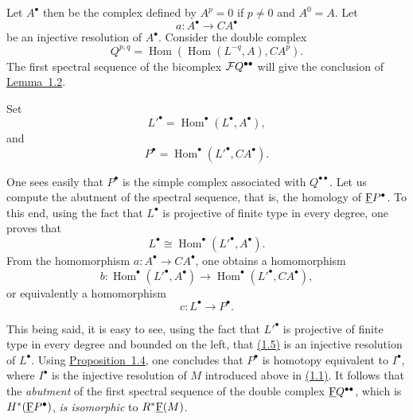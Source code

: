 Let $A^\bullet$ then be the complex defined by $A^p=0$ if $p\ne 0$ and
$A^0=A$. Let
\[
  a\colon A^\bullet\longrightarrow CA^\bullet
\]
be an injective resolution of $A^\bullet$. Consider the double complex
\begin{equation}\label{eq:VIII.1.2}
  Q^{p,q}=\operatorname{Hom}(\operatorname{Hom}(L^{-q},A),CA^p).
\end{equation}
The first spectral sequence of the bicomplex $\cF Q^{\bullet\bullet}$ will
give the conclusion of \hyperref[VIII.1.2]{Lemma~1.2}.

Set
\begin{equation}\label{eq:VIII.1.3}
  {L'}^\bullet=\operatorname{Hom}^\bullet(L^\bullet,A^\bullet),
\end{equation}
and
\begin{equation}\label{eq:VIII.1.4}
  P^\bullet=\operatorname{Hom}^\bullet({L'}^\bullet,CA^\bullet).
\end{equation}


\renewcommand{\theequation}{1.\arabic{equation}}\setcounter{equation}{4}

One sees easily that $P^\bullet$ is the simple complex associated with
$Q^{\bullet\bullet}$. Let us compute the abutment of the spectral sequence,
that is, the homology of $\underline{\mathrm F} P^\bullet$. To this end, using the fact that
$L^\bullet$ is projective of finite type in every degree, one proves that
\[
  L^\bullet \cong \operatorname{Hom}^\bullet({L'}^\bullet,A^\bullet).
\]
From the homomorphism $a\colon A^\bullet\to CA^\bullet$, one obtains a
homomorphism
\[
  b\colon \operatorname{Hom}^\bullet({L'}^\bullet,A^\bullet)
  \longrightarrow \operatorname{Hom}^\bullet({L'}^\bullet,CA^\bullet),
\]
or equivalently a homomorphism
\begin{equation}\label{eq:VIII.1.5}
  c\colon L^\bullet\longrightarrow P^\bullet.
\end{equation}

This being said, it is easy to see, using the fact that ${L'}^\bullet$ is
projective of finite type in every degree and bounded on the left, that
\hyperref[eq:VIII.1.5]{(1.5)} is an injective resolution of $L^\bullet$. Using \hyperref[VIII.1.4]{Proposition~1.4}, one
concludes that $P^\bullet$ is homotopy equivalent to $I^\bullet$, where
$I^\bullet$ is the injective resolution of $M$ introduced above in \hyperref[eq:VIII.1.1]{(1.1)}.
It follows that the \emph{abutment} of the first spectral sequence of the
double complex $\underline{\mathrm F} Q^{\bullet\bullet}$, which is
$H^*(\underline{\mathrm F} P^\bullet)$, \emph{is isomorphic} to $R^*\underline{\mathrm F}(M)$.


